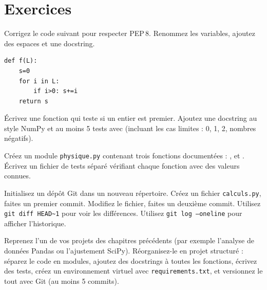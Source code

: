 \section{Exercices}

\begin{exercice}[$\star$]
Corrigez le code suivant pour respecter PEP\,8. Renommez les variables,
ajoutez des espaces et une docstring.
\begin{verbatim}
def f(L):
    s=0
    for i in L:
        if i>0: s+=i
    return s
\end{verbatim}
\end{exercice}

\begin{exercice}[$\star$]
\'Ecrivez une fonction  qui teste si un entier est premier.
Ajoutez une docstring au style NumPy et au moins 5 tests avec 
(incluant les cas limites : 0, 1, 2, nombres n\'egatifs).
\end{exercice}

\begin{exercice}[$\star\star$]
Cr\'eez un module \texttt{physique.py} contenant trois fonctions document\'ees :
,  et
. \'Ecrivez un fichier de tests s\'epar\'e v\'erifiant chaque
fonction avec des valeurs connues.
\end{exercice}

\begin{exercice}[$\star\star$]
Initialisez un d\'ep\^ot Git dans un nouveau r\'epertoire. Cr\'eez un fichier
\texttt{calculs.py}, faites un premier commit. Modifiez le fichier, faites un
deuxi\`eme commit. Utilisez \texttt{git diff HEAD\~{}1} pour voir les diff\'erences.
Utilisez \texttt{git log --oneline} pour afficher l'historique.
\end{exercice}

\begin{exercice}[$\star\star\star$]
Reprenez l'un de vos projets des chapitres pr\'ec\'edents (par exemple l'analyse
de donn\'ees Pandas ou l'ajustement SciPy). R\'eorganisez-le en projet structur\'e :
s\'eparez le code en modules, ajoutez des docstrings \`a toutes les fonctions,
\'ecrivez des tests, cr\'eez un environnement virtuel avec \texttt{requirements.txt},
et versionnez le tout avec Git (au moins 5 commits).
\end{exercice}


